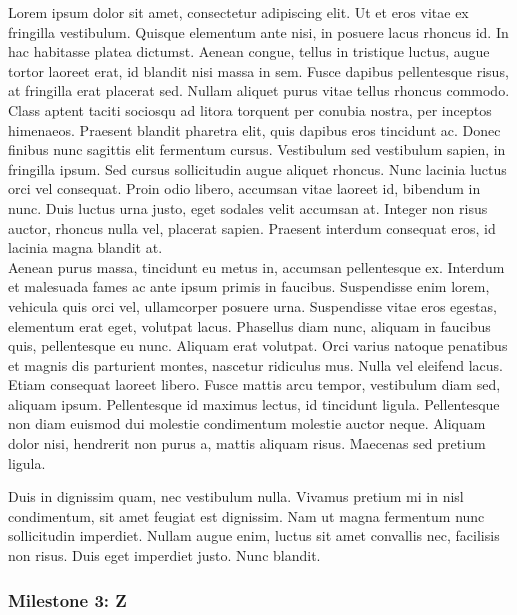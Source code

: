 Lorem ipsum dolor sit amet, consectetur adipiscing elit. Ut et eros vitae ex fringilla vestibulum. Quisque elementum ante nisi, in posuere lacus rhoncus id. In hac habitasse platea dictumst. Aenean congue, tellus in tristique luctus, augue tortor laoreet erat, id blandit nisi massa in sem. Fusce dapibus pellentesque risus, at fringilla erat placerat sed. Nullam aliquet purus vitae tellus rhoncus commodo. Class aptent taciti sociosqu ad litora torquent per conubia nostra, per inceptos himenaeos. Praesent blandit pharetra elit, quis dapibus eros tincidunt ac. Donec finibus nunc sagittis elit fermentum cursus. Vestibulum sed vestibulum sapien, in fringilla ipsum. Sed cursus sollicitudin augue aliquet rhoncus. Nunc lacinia luctus orci vel consequat. Proin odio libero, accumsan vitae laoreet id, bibendum in nunc. Duis luctus urna justo, eget sodales velit accumsan at. Integer non risus auctor, rhoncus nulla vel, placerat sapien. Praesent interdum consequat eros, id lacinia magna blandit at. \\

Aenean purus massa, tincidunt eu metus in, accumsan pellentesque ex. Interdum et malesuada fames ac ante ipsum primis in faucibus. Suspendisse enim lorem, vehicula quis orci vel, ullamcorper posuere urna. Suspendisse vitae eros egestas, elementum erat eget, volutpat lacus. Phasellus diam nunc, aliquam in faucibus quis, pellentesque eu nunc. Aliquam erat volutpat. Orci varius natoque penatibus et magnis dis parturient montes, nascetur ridiculus mus. Nulla vel eleifend lacus. Etiam consequat laoreet libero. Fusce mattis arcu tempor, vestibulum diam sed, aliquam ipsum. Pellentesque id maximus lectus, id tincidunt ligula. Pellentesque non diam euismod dui molestie condimentum molestie auctor neque. Aliquam dolor nisi, hendrerit non purus a, mattis aliquam risus. Maecenas sed pretium ligula.

Duis in dignissim quam, nec vestibulum nulla. Vivamus pretium mi in nisl condimentum, sit amet feugiat est dignissim. Nam ut magna fermentum nunc sollicitudin imperdiet. Nullam augue enim, luctus sit amet convallis nec, facilisis non risus. Duis eget imperdiet justo. Nunc blandit.

\subsubsection{Milestone 3: Z} %

